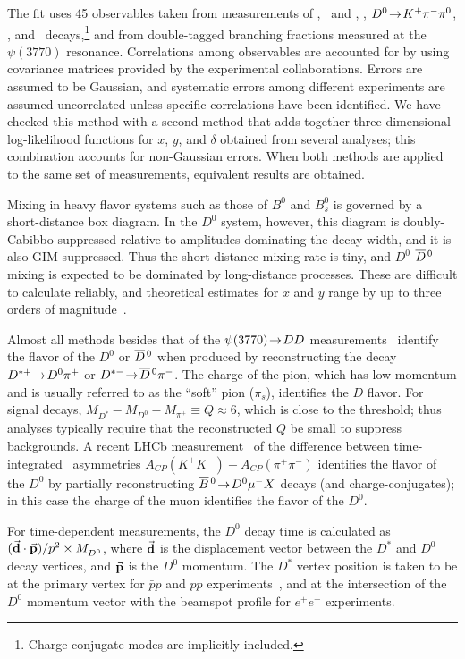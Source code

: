 The fit uses 45 observables taken from 
measurements of \dklnu, \dkk\ and \dpipi, \dkpi, 
$D^0\!\rightarrow\! K^+\pi^-\pi^0$, %
\dkspp, and \dkskk\ decays,\footnote{Charge-conjugate modes
are implicitly included.} and from double-tagged branching 
fractions measured at the $\psi(3770)$ resonance. Correlations 
among observables are accounted for by using covariance matrices 
provided by the experimental collaborations. Errors are assumed
to be Gaussian, and systematic errors among different experiments 
are assumed uncorrelated unless specific correlations have been 
identified.
We have checked this method with a second method that adds
together three-dimensional log-likelihood functions 
for $x$, $y$, and $\delta$ obtained from several analyses;
this combination accounts for non-Gaussian errors.
When both methods are applied to the same set of 
measurements, equivalent results are obtained. 


Mixing in heavy flavor systems such as those of $B^0$ and $B^0_s$ 
is governed by a short-distance box diagram. In the $D^0$ system,
however, this diagram is doubly-Cabibbo-suppressed relative to 
amplitudes dominating the decay width, and it is also GIM-suppressed.
Thus the short-distance mixing rate is tiny, and $D^0$-$\overline{D}{}^{\,0}$ 
mixing is expected to be dominated by long-distance processes. 
These are difficult to calculate reliably, and theoretical
estimates for $x$ and $y$ range by up to three orders of 
magnitude~\cite{Bigi:2000wn,Petrov:2003un,Petrov:2004rf,Falk:2004wg}.

Almost all methods besides that of the $\psi(3770)\!\rightarrow\! DD$
measurements~\cite{Asner:2012xb} identify the flavor of the
$D^0$ or $\overline{D}{}^{\,0}$ when produced by reconstructing the decay
$D^{*+}\!\rightarrow\! D^0\pi^+$ or $D^{*-}\!\rightarrow\!\overline{D}{}^{\,0}\pi^-$. The charge
of the pion, which has low momentum and is usually 
referred to as the ``soft'' pion ($\pi^{}_s$),
identifies the $D$ flavor. For signal 
decays, $M^{}_{D^*}-M^{}_{D^0}-M^{}_{\pi^+}\equiv Q\approx 6$\meve, 
which is close to the threshold; thus analyses typically
require that the reconstructed $Q$ be small to suppress backgrounds. 
A recent LHCb measurement~\cite{Aaij:2014gsa} of the difference
between time-integrated \cp\ asymmetries
$A_{CP}(K^+K^-) - A_{CP}(\pi^+\pi^-)$ identifies the flavor of
the $D^0$ by partially reconstructing $\overline{B}{}^{\,0}\!\rightarrow\! D^0\mu^- X$ 
decays (and charge-conjugates); in this case the charge of
the muon identifies the flavor of the $D^0$.

For time-dependent measurements, the $D^0$ decay time is 
calculated as 
$(\vec{\bf d}\cdot\vec{\bf p})/p^2\times M^{}_{D^0}$, 
where $\vec{\bf d}$ is the displacement vector between the
$D^*$ and $D^0$ decay vertices, and $\vec{\bf p}$ is the
$D^0$ momentum. The $D^*$ vertex position is 
taken to be at the primary vertex for $\bar{p}p$ and $pp$
experiments~\cite{Aaltonen:2007uc,Aaij:2013wda}, and at
the intersection of the $D^0$ momentum vector with the
beamspot profile for $e^+e^-$ experiments.


